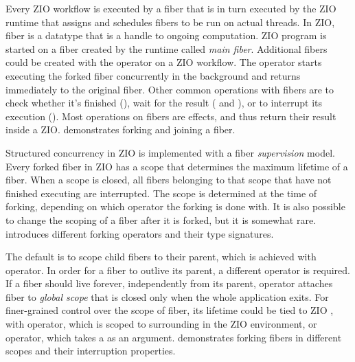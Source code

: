 Every ZIO workflow is executed by a fiber that is in turn executed by the ZIO runtime that assigns and schedules fibers to be run on actual threads. In ZIO, fiber is a datatype that is a handle to ongoing computation. ZIO program is started on a fiber created by the runtime called \textit{main fiber}. Additional fibers could be created with the  operator on a ZIO workflow. The  operator starts executing the forked fiber concurrently in the background and returns immediately to the original fiber. Other common operations with fibers are to check whether it's finished (), wait for the result ( and ), or to interrupt its execution (). Most operations on fibers are effects, and thus return their result inside a ZIO.  demonstrates forking and joining a fiber.



Structured concurrency in ZIO is implemented with a fiber \textit{supervision} model. Every forked fiber in ZIO has a scope that determines the maximum lifetime of a fiber. When a scope is closed, all fibers belonging to that scope that have not finished executing are interrupted. The scope is determined at the time of forking, depending on which operator the forking is done with. It is also possible to change the scoping of a fiber after it is forked, but it is somewhat rare.  introduces different forking operators and their type signatures.



The default is to scope child fibers to their parent, which is achieved with  operator. In order for a fiber to outlive its parent, a different operator is required. If a fiber should live forever, independently from its parent,  operator attaches fiber to \textit{global scope} that is closed only when the whole application exits. For finer-grained control over the scope of fiber, its lifetime could be tied to ZIO , with  operator, which is scoped to surrounding  in the ZIO environment, or  operator, which takes a  as an argument.  demonstrates forking fibers in different scopes and their interruption properties.



